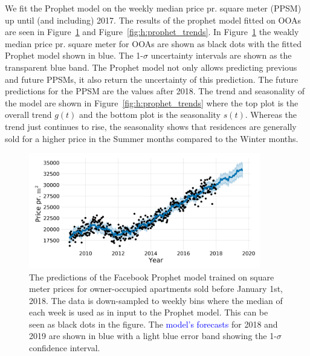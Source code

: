 \documentclass[a4paper, twoside, nobib]{tufte-book}
\begin{document}
We fit the Prophet model on the weekly median price pr. square meter (PPSM) up until (and including) \num{2017}. The results of the prophet model fitted on OOAs are seen in Figure~\ref{fig:h:prophet_forecast} and Figure~\ref{fig:h:prophet_trends}. In Figure~\ref{fig:h:prophet_forecast} the weakly median price pr. square meter for OOAs are shown as black dots with the fitted Prophet model shown in blue. The \num{1}-$\sigma$ uncertainty intervals are shown as the transparent blue band. The Prophet model not only allows predicting previous and future PPSMs, it also return the uncertainty of this prediction. The future predictions for the PPSM are the values after 2018. The trend and seasonality of the model are shown in Figure~\ref{fig:h:prophet_trends} where the top plot is the overall trend $g(t)$ and the bottom plot is the seasonality $s(t)$. Whereas the trend just continues to rise, the seasonality shows that residences are generally sold for a higher price in the Summer months compared to the Winter months. 

\begin{figure}
  \includegraphics[draft, width=0.9\textwidth, trim=15 15 15 15, clip]{figures/housing/Ejerlejlighed_v18_cut_all_Ncols_all_prophet_forecast.png}
  \caption[Prophet Forecast for apartments]
          {The predictions of the Facebook Prophet model trained on square meter prices for owner-occupied apartments sold before January 1st, 2018. The data is down-sampled to weekly bins where the median of each week is used as in input to the Prophet model. This can be seen as black dots in the figure. The \textcolor{blue}{model's forecasts} for 2018 and 2019 are shown in blue with a light blue \textcolor{light-blue}{error band} showing the \num{1}-$\sigma$ confidence interval.
          }
  \label{fig:h:prophet_forecast}
\end{figure}
\end{document}
